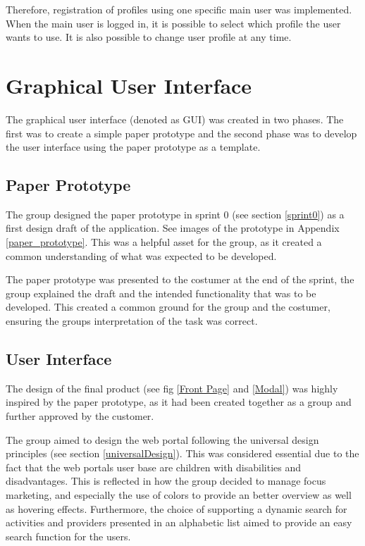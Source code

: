 Therefore, registration of profiles using one specific main user was implemented. When the main user is logged in, it is possible to select which profile the user wants to use. It is also possible to change user profile at any time.

\section{Graphical User Interface}
The graphical user interface (denoted as GUI) was created in two phases. The first was to create a simple paper prototype and the second phase was to develop the user interface using the paper prototype as a template.

\subsection{Paper Prototype} \label{ss:paper_prototype}
The group designed the paper prototype in sprint 0 (see section \ref{sprint0}) as a first design draft of the application. See images of the prototype in Appendix \ref{paper_prototype}. This was a helpful asset for the group, as it created a common understanding of what was expected to be developed.

The paper prototype was presented to the costumer at the end of the sprint, the group explained the draft and the intended functionality that was to be developed. This created a common ground for the group and the costumer, ensuring the groups interpretation of the task was correct.  

\subsection{User Interface}
The design of the final product (see fig \ref{Front Page} and \ref{Modal}) was highly inspired by the paper prototype, as it had been created together as a group and further approved by the customer. 

The group aimed to design the web portal following the universal design principles (see section \ref{universalDesign}). This was considered essential due to the fact that the web portals user base are children with disabilities and disadvantages. This is reflected in how the group decided to manage focus marketing, and especially the use of colors to provide an better overview as well as hovering effects. Furthermore, the choice of supporting a dynamic search for activities and providers presented in an alphabetic list aimed to provide an easy search function for the users. 

